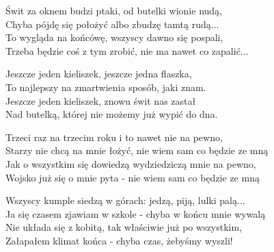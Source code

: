 \begin{text}
    \footnotesize{
    Świt za oknem budzi ptaki, od butelki wionie nudą,\\
    Chyba pójdę się położyć albo zbudzę tamtą rudą...\\
    To wygląda na końcówę, wszyscy dawno się pospali,\\
    Trzeba będzie coś z tym zrobić, nie ma nawet co zapalić...

    \vin Jeszcze jeden kieliszek, jeszcze jedna flaszka,\\
    \vin To najlepszy na zmartwienia sposób, jaki znam.\\
    \vin Jeszcze jeden kieliszek, znowu świt nas zastał\\
    \vin Nad butelką, której nie możemy już wypić do dna.

    Trzeci raz na trzecim roku i to nawet nie na pewno,\\
    Starzy nie chcą na mnie łożyć, nie wiem sam co będzie ze mną\\
    Jak o wszystkim się dowiedzą wydziedziczą mnie na pewno,\\
    Wojsko już się o mnie pyta - nie wiem sam co będzie ze mną

    Wszyscy kumple siedzą w górach: jedzą, piją, lulki palą...\\
    Ja się czasem zjawiam w szkole - chyba w końcu mnie wywalą\\
    Nie układa się z kobitą, tak właściwie już po wszystkim,\\
    Załapałem klimat końca - chyba czas, żebyśmy wyszli!
    }
\end{text}
\begin{chord}

\end{chord}